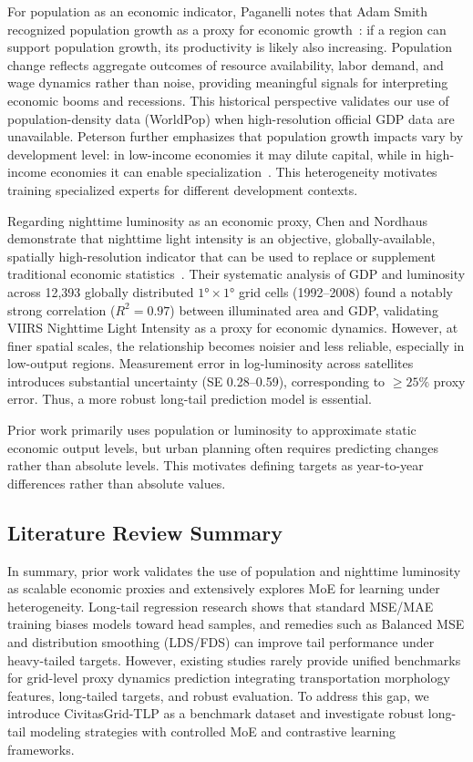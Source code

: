 \documentclass[11pt,conference,onecolumn]{IEEEtran}
\begin{document}
For population as an economic indicator, Paganelli notes that Adam Smith recognized population growth as a proxy for economic growth~\cite{paganelli2021populationgdp}: if a region can support population growth, its productivity is likely also increasing. Population change reflects aggregate outcomes of resource availability, labor demand, and wage dynamics rather than noise, providing meaningful signals for interpreting economic booms and recessions. This historical perspective validates our use of population-density data (WorldPop) when high-resolution official GDP data are unavailable. Peterson further emphasizes that population growth impacts vary by development level: in low-income economies it may dilute capital, while in high-income economies it can enable specialization~\cite{peterson2017rolepopulation}. This heterogeneity motivates training specialized experts for different development contexts.

Regarding nighttime luminosity as an economic proxy, Chen and Nordhaus demonstrate that nighttime light intensity is an objective, globally-available, spatially high-resolution indicator that can be used to replace or supplement traditional economic statistics~\cite{chen2011luminosity}. Their systematic analysis of GDP and luminosity across 12,393 globally distributed $1° \times 1°$ grid cells (1992--2008) found a notably strong correlation ($R^2 = 0.97$) between illuminated area and GDP, validating VIIRS Nighttime Light Intensity as a proxy for economic dynamics. However, at finer spatial scales, the relationship becomes noisier and less reliable, especially in low-output regions. Measurement error in log-luminosity across satellites introduces substantial uncertainty (SE 0.28--0.59), corresponding to $\ge 25\%$ proxy error. Thus, a more robust long-tail prediction model is essential.

Prior work primarily uses population or luminosity to approximate static economic output levels, but urban planning often requires predicting changes rather than absolute levels. This motivates defining targets as year-to-year differences rather than absolute values.

\subsection{Literature Review Summary}

In summary, prior work validates the use of population and nighttime luminosity as scalable economic proxies and extensively explores MoE for learning under heterogeneity. Long-tail regression research shows that standard MSE/MAE training biases models toward head samples, and remedies such as Balanced MSE and distribution smoothing (LDS/FDS) can improve tail performance under heavy-tailed targets. However, existing studies rarely provide unified benchmarks for grid-level proxy dynamics prediction integrating transportation morphology features, long-tailed targets, and robust evaluation. To address this gap, we introduce CivitasGrid-TLP as a benchmark dataset and investigate robust long-tail modeling strategies with controlled MoE and contrastive learning frameworks.
\end{document}
